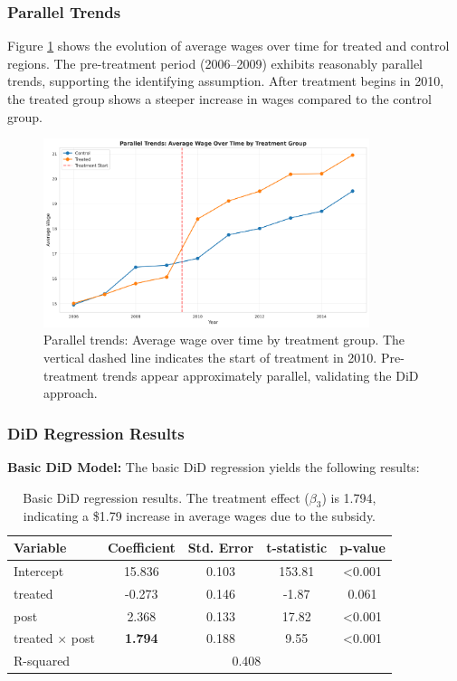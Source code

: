 \documentclass[a4paper,12pt,headsepline]{scrartcl} %
\begin{document}
\subsubsection{Parallel Trends}
Figure \ref{fig:parallel_trends} shows the evolution of average wages over time for treated and control regions. The pre-treatment period (2006--2009) exhibits reasonably parallel trends, supporting the identifying assumption. After treatment begins in 2010, the treated group shows a steeper increase in wages compared to the control group.

\begin{figure}[H]
    \centering
    \includegraphics[width=0.85\textwidth]{parallel_trends_plot.png}
    \caption{Parallel trends: Average wage over time by treatment group. The vertical dashed line indicates the start of treatment in 2010. Pre-treatment trends appear approximately parallel, validating the DiD approach.}
    \label{fig:parallel_trends}
\end{figure}

\subsubsection{DiD Regression Results}

\textbf{Basic DiD Model:}
The basic DiD regression yields the following results:

\begin{table}[H]
\centering
\begin{tabular}{lcccc}
\toprule
Variable & Coefficient & Std. Error & t-statistic & p-value \\
\midrule
Intercept & 15.836 & 0.103 & 153.81 & <0.001 \\
treated & -0.273 & 0.146 & -1.87 & 0.061 \\
post & 2.368 & 0.133 & 17.82 & <0.001 \\
treated $\times$ post & \textbf{1.794} & 0.188 & 9.55 & <0.001 \\
\midrule
R-squared & \multicolumn{4}{c}{0.408} \\
\bottomrule
\end{tabular}
\caption{Basic DiD regression results. The treatment effect ($\beta_3$) is 1.794, indicating a \$1.79 increase in average wages due to the subsidy.}
\label{tab:did_basic}
\end{table}
\end{document}
